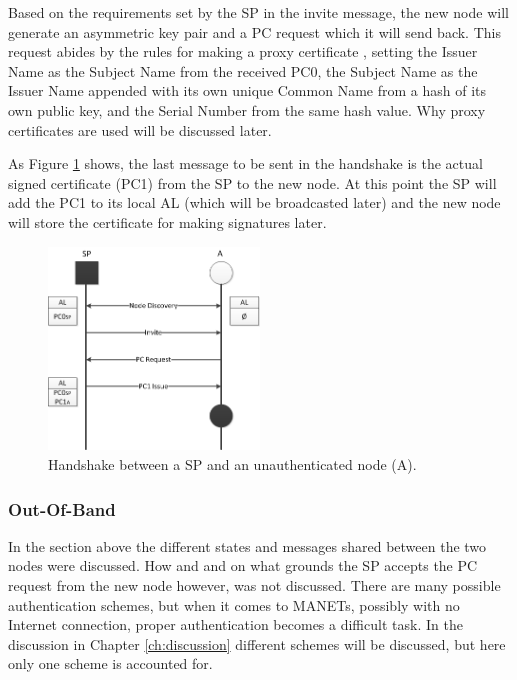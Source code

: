 Based on the requirements set by the \ac{SP} in the invite message, the new node
will generate an asymmetric key pair and a \ac{PC} request which it will send
back. This request abides by the rules for making a proxy certificate
\cite{rfc3820}, setting the Issuer Name as the Subject Name from the received
\ac{PC0}, the Subject Name as the Issuer Name appended with its own unique
Common Name from a hash of its own public key, and the Serial Number from the
same hash value. Why proxy certificates are used will be discussed later.

As Figure \ref{fig:node_states_handshake} shows, the last message to be sent in
the handshake is the actual signed certificate (\ac{PC1}) from the \ac{SP} to
the new node. At this point the \ac{SP} will add the \ac{PC1} to its local
\ac{AL} (which will be broadcasted later) and the new node will store the
certificate for making signatures later.

\begin{figure}[h]
	\centering
  	\includegraphics[width=0.5\textwidth]{images/node_states_handshake.png}
  	\caption{Handshake between a \acf{SP} and an unauthenticated node (A).}
	\label{fig:node_states_handshake}
\end{figure}

\subsubsection*{Out-Of-Band}
In the section above the different states and messages shared between the two
nodes were discussed. How and and on what grounds the \ac{SP} accepts the
\ac{PC} request from the new node however, was not discussed. There are many
possible authentication schemes, but when it comes to \acp{MANET}, possibly with
no Internet connection, proper authentication becomes a difficult task. In
the discussion in Chapter \ref{ch:discussion} different schemes will be
discussed, but here only one scheme is accounted for.

